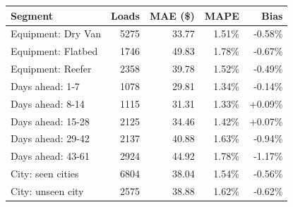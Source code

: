 \begin{tabular}{lrrrr}
\toprule
Segment & Loads & MAE (\$) & MAPE & Bias \\
\midrule
Equipment: Dry Van & 5275 & 33.77 & 1.51\% & -0.58\% \\
Equipment: Flatbed & 1746 & 49.83 & 1.78\% & -0.67\% \\
Equipment: Reefer & 2358 & 39.78 & 1.52\% & -0.49\% \\
Days ahead: 1-7 & 1078 & 29.81 & 1.34\% & -0.14\% \\
Days ahead: 8-14 & 1115 & 31.31 & 1.33\% & +0.09\% \\
Days ahead: 15-28 & 2125 & 34.46 & 1.42\% & +0.07\% \\
Days ahead: 29-42 & 2137 & 40.88 & 1.63\% & -0.94\% \\
Days ahead: 43-61 & 2924 & 44.92 & 1.78\% & -1.17\% \\
City: seen cities & 6804 & 38.04 & 1.54\% & -0.56\% \\
City: unseen city & 2575 & 38.88 & 1.62\% & -0.62\% \\
\bottomrule
\end{tabular}
